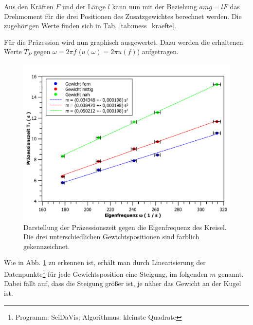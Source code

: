 Aus den Kräften $F$ und der Länge $l$ kann nun mit der Beziehung $amg = lF$ das Drehmoment für die drei Positionen des Zusatzgewichtes berechnet werden.
Die zugehörigen Werte finden sich in Tab. \ref{tab:mess_kraefte}.

Für die Präzession wird nun graphisch ausgewertet.
Dazu werden die erhaltenen Werte $T_P$ gegen $\omega = 2\pi f$ ($u(\omega) = 2\pi u(f)$) aufgetragen.
\begin{figure}[ht]
	\centering
	\includegraphics[width=\textwidth]{auswertung/kreisel_wT_multi.pdf}
	\caption{Darstellung der Präzessionszeit gegen die Eigenfrequenz des Kreisel. Die drei unterschiedlichen Gewichtspositionen sind farblich gekennzeichnet.}
	\label{abb:Tw-multi}	
\end{figure}
Wie in Abb. \ref{abb:Tw-multi} zu erkennen ist, erhält man durch Linearisierung der Datenpunkte\footnote{Programm: SciDaVis; Algorithmus: kleinste Quadrate} für jede Gewichtsposition eine Steigung, im folgenden $m$ genannt.
Dabei fällt auf, dass die Steigung größer ist, je näher das Gewicht an der Kugel ist.

